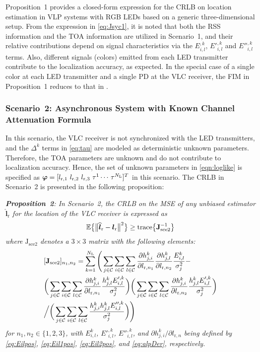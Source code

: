 \documentclass[10pt,twocolumn]{IEEEtran}
\newcommand{\NL}{N_{\rm{L}}}
\newcommand{\bvp}{{\boldsymbol{\varphi}}}
\newcommand{\mtC}{{\mathcal{C}}}
\newcommand{\expectation}{{\mathbb{E}}}
\newcommand{\lr}{{\boldsymbol{l}_{\mathrm{r}}}}
\newcommand{\lrh}{{\widehat{\boldsymbol{l}}_{\mathrm{r}}}}
\newcommand{\lrs}[1]{{l_{\mathrm{r},#1}}}
\newcommand{\Jasyi}{{\boldsymbol{\mathrm{J}}_{\mathrm{sce2}}^{-1}}}
\newcommand{\Jasy}{{\boldsymbol{\mathrm{J}}_{\mathrm{sce2}}}}
\begin{document}
Proposition~1 provides a closed-form expression for the CRLB on location estimation in VLP systems with RGB LEDs based on a generic three-dimensional setup. From the expression in \eqref{eq:Jsyc1}, it is noted that both the RSS information and the TOA information are utilized in Scenario~1, and their relative contributions depend on signal characteristics via the $E^{,k}_{i,l}$, $E'^{,k}_{i,l}$ and $E''^{,k}_{i,l}$ terms. Also, different signals (colors) emitted from each LED transmitter contribute to the localization accuracy, as expected. In the special case of a single color at each LED transmitter and a single PD at the VLC receiver, the FIM in Proposition~1 reduces to that in \cite[Prop.~1]{Direct_TCOM}.


\subsubsection{Scenario~2: Asynchronous System with Known Channel Attenuation Formula}\label{sec:Case2pos}

In this scenario, the VLC receiver is not synchronized with the LED transmitters, and the $\Delta^k$ terms in \eqref{eq:tau} are modeled as deterministic unknown parameters. Therefore, the TOA parameters are unknown and do not contribute to localization accuracy. Hence, the set of unknown parameters in \eqref{eqn:loglike} is specified as $\bvp=[\lrs{1}~\lrs{2}~\lrs{3}~\tau^1\cdots\,\tau^{\NL}]^T$ in this scenario. The CRLB in Scenario~2 is presented in the following proposition:

\textit{\textbf{Proposition~2}: In Scenario~2, the CRLB on the MSE of any unbiased estimator $\lrh$ for the location of the VLC receiver is expressed as}
\begin{gather}\label{eq:CRLBasyn}
\expectation \big\{ \big\|\lrh - \lr \big\|^2 \big\}\geq{\rm{trace}}\big\{\Jasyi\big\}
\end{gather}
\textit{where $\Jasy$ {denotes} a $3\times3$ matrix with the following elements:}
\begin{align}\nonumber
&[\Jasy]_{n_1,n_2}=\sum_{k=1}^{\NL}\Bigg(\sum_{j\in{\mtC}}\sum_{i\in{\mtC}}
\sum_{l\in{\mtC}}\frac{\partial h^k_{j,i}}{\partial \lrs{n_1}}\frac{\partial h^k_{j,l}}{\partial \lrs{n_2}}\frac{E^k_{i,l}}{\sigma_j^2}-
\\\nonumber&\bigg(\sum_{j\in{\mtC}}\sum_{i\in{\mtC}}\sum_{l\in{\mtC}}\frac{\partial h^k_{j,i}}{\partial \lrs{n_1}}\frac{h^k_{j,l}E'^{,k}_{i,l}}{\sigma_j^2}\bigg)
\bigg(\sum_{j\in{\mtC}}\sum_{i\in{\mtC}}\sum_{l\in{\mtC}}\frac{\partial h^k_{j,i}}{\partial \lrs{n_2}}\frac{h^k_{j,l}E'^{,k}_{i,l}}{\sigma_j^2}\bigg)
\\\label{eq:JasyExp}
&\Big{/}\bigg(\sum_{j\in{\mtC}}\sum_{i\in{\mtC}}\sum_{l\in{\mtC}}
\frac{h^k_{j,i}h^k_{j,l}E''^{,k}_{i,l}}{\sigma_j^2}\bigg)\Bigg)
\end{align}
\textit{for $n_1,n_2\in\{1,2,3\}$, with $E^k_{i,l}$, $E'^{,k}_{i,l}$, $E''^{,k}_{i,l}$, and ${\partial h^k_{j,i}}/{\partial \lrs{n}}$ being defined by \eqref{eq:Eilpos}, \eqref{eq:Eil1pos}, \eqref{eq:Eil2pos}, and \eqref{eq:alpDer}, respectively.}
\end{document}
